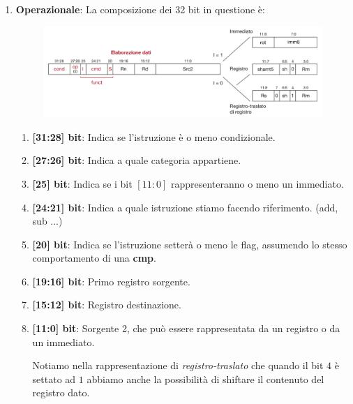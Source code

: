 \documentclass{article}
\begin{document}
\begin{enumerate}
    \item \textbf{Operazionale}: La composizione dei 32 bit in questione è:
    \vspace*{10px}
    \begin{figure}[htbp]
        \center
        \includegraphics[scale=0.22]{img/istrOperazionale.png}
    \end{figure}

    \begin{enumerate}
        \item \textbf{[31:28] bit}: Indica se l'istruzione è o meno condizionale.
        \vspace*{8px}
        \item \textbf{[27:26] bit}: Indica a quale categoria appartiene.
        \vspace*{8px}
        \item \textbf{[25] bit}: Indica se i bit $[11:0]$ rappresenteranno o meno un immediato.
        \vspace*{8px}
        \item \textbf{[24:21] bit}: Indica a quale istruzione stiamo facendo riferimento. (add, sub ...)
        \vspace*{8px}
        \item \textbf{[20] bit}: Indica se l'istruzione setterà o meno le flag, assumendo lo stesso comportamento di una \textbf{cmp}.
        \vspace*{8px}
        \item \textbf{[19:16] bit}: Primo registro sorgente.
        \vspace*{8px}
        \item \textbf{[15:12] bit}: Registro destinazione.
        \vspace*{8px}
        \item \textbf{[11:0] bit}: Sorgente 2, che può essere rappresentata da un registro o da un immediato.
        
        Notiamo nella rappresentazione di \textit{registro-traslato}
        che quando il bit $4$ è settato ad $1$ abbiamo anche la possibilità di shiftare il contenuto del registro dato.
    \end{enumerate}


\end{enumerate}
\end{document}
